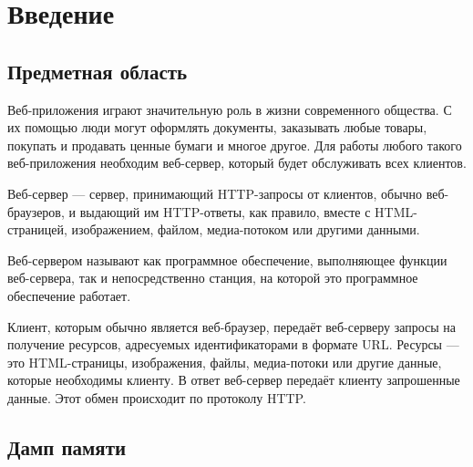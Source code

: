 \documentclass[20pt]{article}
\begin{document}
\newpage

\tableofcontents

\newpage

\section{Введение}

\subsection{Предметная область}

Веб-приложения играют значительную роль в жизни современного общества. С их
помощью люди могут оформлять документы, заказывать любые товары, покупать и
продавать ценные бумаги и многое другое. Для работы любого такого веб-приложения
необходим веб-сервер, который будет обслуживать всех клиентов.

Веб-сервер \cite{wiki/web-server} — сервер, принимающий HTTP-запросы от клиентов,
обычно веб-браузеров, и выдающий им HTTP-ответы, как правило, вместе с
HTML-страницей, изображением, файлом, медиа-потоком или другими данными.

Веб-сервером называют как программное обеспечение, выполняющее функции веб-сервера,
так и непосредственно станция, на которой это программное обеспечение работает.

Клиент, которым обычно является веб-браузер, передаёт веб-серверу запросы на
получение ресурсов, адресуемых идентификаторами в формате URL. Ресурсы — это
HTML-страницы, изображения, файлы, медиа-потоки или другие данные, которые
необходимы клиенту. В ответ веб-сервер передаёт клиенту запрошенные данные.
Этот обмен происходит по протоколу HTTP.

\subsection{Дамп памяти}
\end{document}
